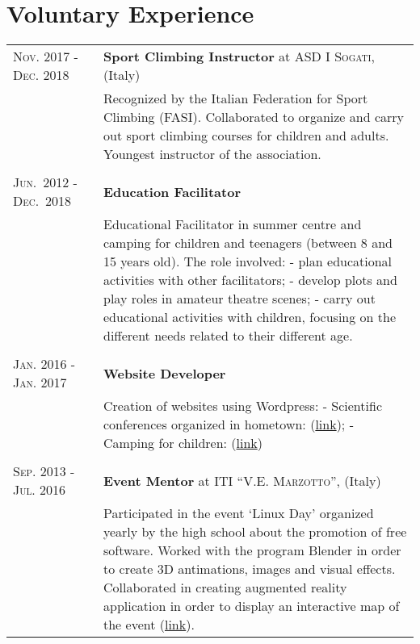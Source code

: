 \documentclass[a4paper,11pt]{article}
\begin{document}
\section{Voluntary Experience}
\begin{tabular}{m{0.225\linewidth}|p{0.775\linewidth}}
  \textsc{Nov. 2017 - Dec. 2018} &\textbf{Sport Climbing Instructor} at \textsc{ASD I Sogati}, (Italy)\\
  &  Recognized by the Italian Federation for Sport Climbing (FASI). Collaborated to organize and carry out sport climbing courses for children and adults. Youngest instructor of the association.\\

   \\

  \textsc{Jun.~2012 - Dec.~2018} &
  \textbf{Education Facilitator} \\
  & Educational Facilitator in summer centre and camping for children and teenagers (between 8 and 15 years old). The role involved: - plan educational activities with other facilitators; - develop plots and play roles in amateur theatre scenes; - carry out educational activities with children, focusing on the different needs related to their different age.\\

   \\
  

  \textsc{Jan. 2016 - Jan. 2017}& \textbf{Website Developer} \\
  & Creation of websites using Wordpress:
  - Scientific conferences organized in hometown: (\href{http://laviadellescienze.altervista.org/}{link}); - Camping for children: (\href{http://campomaglio.altervista.org/}{link})\\

   \\

  \textsc{Sep. 2013 - Jul. 2016} &
  \textbf{Event Mentor} at \textsc{ITI “V.E. Marzotto”}, (Italy)\\
  & Participated in the event `Linux Day' organized yearly by the high school about the promotion of free software. Worked with the program Blender in order to create 3D antimations, images and visual effects. Collaborated in creating augmented reality application in order to display an interactive map of the event (\href{https://play.google.com/store/apps/details?id=it.itismarzotto.armaps&hl=it}{link}).\\
\end{tabular}
\end{document}

